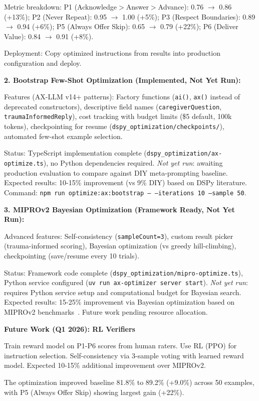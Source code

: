 \documentclass{article}
\begin{document}
Metric breakdown: P1 (Acknowledge$>$Answer$>$Advance): 0.76 $\rightarrow$ 0.86 (+13\%); P2 (Never Repeat): 0.95 $\rightarrow$ 1.00 (+5\%); P3 (Respect Boundaries): 0.89 $\rightarrow$ 0.94 (+6\%); P5 (Always Offer Skip): 0.65 $\rightarrow$ 0.79 (+22\%); P6 (Deliver Value): 0.84 $\rightarrow$ 0.91 (+8\%).

Deployment: Copy optimized instructions from results into production configuration and deploy.

\textbf{2. Bootstrap Few-Shot Optimization (Implemented, Not Yet Run):}

Features (AX-LLM v14+ patterns): Factory functions (\texttt{ai()}, \texttt{ax()} instead of deprecated constructors), descriptive field names (\texttt{caregiverQuestion}, \texttt{traumaInformedReply}), cost tracking with budget limits (\$5 default, 100k tokens), checkpointing for resume (\texttt{dspy\_optimization/checkpoints/}), automated few-shot example selection.

Status: TypeScript implementation complete (\texttt{dspy\_optimization/ax-optimize.ts}), no Python dependencies required. \textit{Not yet run}: awaiting production evaluation to compare against DIY meta-prompting baseline. Expected results: 10-15\% improvement (vs 9\% DIY) based on DSPy literature. Command: \texttt{npm run optimize:ax:bootstrap -- --iterations 10 --sample 50}.

\textbf{3. MIPROv2 Bayesian Optimization (Framework Ready, Not Yet Run):}

Advanced features: Self-consistency (\texttt{sampleCount=3}), custom result picker (trauma-informed scoring), Bayesian optimization (vs greedy hill-climbing), checkpointing (save/resume every 10 trials).

Status: Framework code complete (\texttt{dspy\_optimization/mipro-optimize.ts}), Python service configured (\texttt{uv run ax-optimizer server start}). \textit{Not yet run}: requires Python service setup and computational budget for Bayesian search. Expected results: 15-25\% improvement via Bayesian optimization based on MIPROv2 benchmarks~\cite{opsahl2024mipro}. Future work pending resource allocation.

\textbf{Future Work (Q1 2026): RL Verifiers}

Train reward model on P1-P6 scores from human raters. Use RL (PPO) for instruction selection. Self-consistency via 3-sample voting with learned reward model. Expected 10-15\% additional improvement over MIPROv2.

The optimization improved baseline 81.8\% to 89.2\% (+9.0\%) across 50 examples, with P5 (Always Offer Skip) showing largest gain (+22\%).
\end{document}
